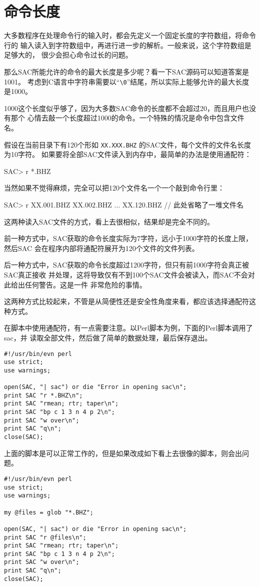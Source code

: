 \section{命令长度}
大多数程序在处理命令行的输入时，都会先定义一个固定长度的字符数组，将命令行的
输入读入到字符数组中，再进行进一步的解析。一般来说，这个字符数组是足够大的，
很少会担心命令过长的问题。

那么SAC所能允许的命令的最大长度是多少呢？看一下SAC源码可以知道答案是1001。
考虑到C语言中字符串需要以``\verb|\0|''结尾，所以实际上能够允许的最大长度是1000。

1000这个长度似乎够了，因为大多数SAC命令的长度都不会超过20，而且用户也没有那个
心情去敲一个长度超过1000的命令。一个特殊的情况是命令中包含文件名。

假设在当前目录下有120个形如 \texttt{XX.XXX.BHZ} 的SAC文件，每个文件的文件名长度为10字符。
如果要将全部SAC文件读入到内存中，最简单的办法是使用通配符：
\begin{SACCode}
SAC> r *.BHZ
\end{SACCode}
当然如果不觉得麻烦，完全可以把120个文件名一个一个敲到命令行里：
\begin{SACCode}
SAC> r XX.001.BHZ XX.002.BHZ ... XX.120.BHZ // 此处省略了一堆文件名
\end{SACCode}

这两种读入SAC文件的方式，看上去很相似，结果却是完全不同的。

前一种方式中，SAC获取的命令长度实际为7字符，远小于1000字符的长度上限，然后SAC
会在程序内部将通配符展开为120个文件的文件列表。

后一种方式中，SAC获取的命令长度超过1200字符，但只有前1000字符会真正被SAC真正接收
并处理，这将导致仅有不到100个SAC文件会被读入，而SAC不会对此给出任何警告。这是一件
非常危险的事情。

这两种方式比较起来，不管是从简便性还是安全性角度来看，都应该选择通配符这种方式。

在脚本中使用通配符，有一点需要注意。以Perl脚本为例，下面的Perl脚本调用了sac，并
读取全部文件，然后做了简单的数据处理，最后保存退出。

\begin{verbatim}
#!/usr/bin/evn perl
use strict;
use warnings;

open(SAC, "| sac") or die "Error in opening sac\n";
print SAC "r *.BHZ\n";
print SAC "rmean; rtr; taper\n";
print SAC "bp c 1 3 n 4 p 2\n";
print SAC "w over\n";
print SAC "q\n";
close(SAC);
\end{verbatim}

上面的脚本是可以正常工作的，但是如果改成如下看上去很像的脚本，则会出问题。
\begin{verbatim}
#!/usr/bin/evn perl
use strict;
use warnings;

my @files = glob "*.BHZ";

open(SAC, "| sac") or die "Error in opening sac\n";
print SAC "r @files\n";
print SAC "rmean; rtr; taper\n";
print SAC "bp c 1 3 n 4 p 2\n";
print SAC "w over\n";
print SAC "q\n";
close(SAC);
\end{verbatim}

